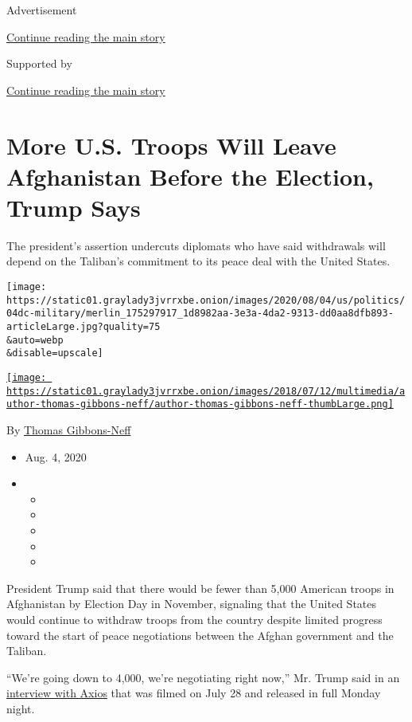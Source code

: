Advertisement

\protect\hyperlink{after-top}{Continue reading the main story}

Supported by

\protect\hyperlink{after-sponsor}{Continue reading the main story}

\hypertarget{more-us-troops-will-leave-afghanistan-before-the-election-trump-says}{%
\section{More U.S. Troops Will Leave Afghanistan Before the Election,
Trump
Says}\label{more-us-troops-will-leave-afghanistan-before-the-election-trump-says}}

The president's assertion undercuts diplomats who have said withdrawals
will depend on the Taliban's commitment to its peace deal with the
United States.

\texttt{[image: https://static01.graylady3jvrrxbe.onion/images/2020/08/04/us/politics/04dc-military/merlin\_175297917\_1d8982aa-3e3a-4da2-9313-dd0aa8dfb893-articleLarge.jpg?quality=75\\\&auto=webp\\\&disable=upscale]}

\href{https://www.nytimes3xbfgragh.onion/by/thomas-gibbons-neff}{\texttt{[image: https://static01.graylady3jvrrxbe.onion/images/2018/07/12/multimedia/author-thomas-gibbons-neff/author-thomas-gibbons-neff-thumbLarge.png]}}

By
\href{https://www.nytimes3xbfgragh.onion/by/thomas-gibbons-neff}{Thomas
Gibbons-Neff}

\begin{itemize}
\item
  Aug. 4, 2020
\item
  \begin{itemize}
  \item
  \item
  \item
  \item
  \item
  \end{itemize}
\end{itemize}

President Trump said that there would be fewer than 5,000 American
troops in Afghanistan by Election Day in November, signaling that the
United States would continue to withdraw troops from the country despite
limited progress toward the start of peace negotiations between the
Afghan government and the Taliban.

``We're going down to 4,000, we're negotiating right now,'' Mr. Trump
said in an
\href{https://www.axios.com/full-axios-hbo-interview-donald-trump-cd5a67e1-6ba1-46c8-bb3d-8717ab9f3cc5.html}{interview
with Axios} that was filmed on July 28 and released in full Monday
night.

